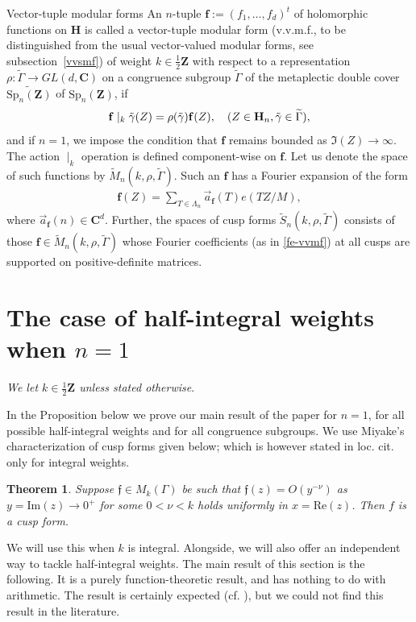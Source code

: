 \documentclass[12pt]{amsart}
\makeatletter
\numberwithin{equation}{section}
\renewcommand\subsubsection{\@secnumfont}{\bfseries}%
\renewcommand\subsubsection{\@startsection{subsubsection}{3}
  \z@{.5\linespacing\@plus.7\linespacing}{-.5em}%
  {\normalfont\bfseries}}
\theoremstyle{plain}
\newtheorem{thm}{Theorem}[section]
\theoremstyle{definition}
\newcommand{\C}{\mf C}
\newcommand{\h}{\mf H}
\newcommand{\re}{\mrm{Re}}
\newcommand{\im}{\mrm{Im}}
\newcommand{\mf}{\mathbf}
\newcommand{\q}{\quad}
\newcommand{\mk}{\mathfrak}
\newcommand{\mrm}{\mathrm}
\newcommand{\spn}{\mrm{Sp}_n(\mf Z)}
\newcommand{\g}{\Tilde{\gamma}}
\newcommand{\mkgam}{M_k(\Gamma)}
\newcommand{\sumn}{\sum \nolimits}
\makeatother
\begin{document}
\subsubsection{Vector-tuple modular forms} \label{vvmf-sec}
An $n$-tuple $\mf f:= (f_1,\ldots,f_d)^t$ of holomorphic functions on $\mf H$ is called a vector-tuple modular form (v.v.m.f., to be distinguished from the usual vector-valued modular forms, see subsection~\ref{vvsmf}) of weight $k \in \tfrac{1}{2}\mf Z$ with respect to a representation $\rho \colon \widetilde{\Gamma} \to GL(d,\mf C)$ on a congruence subgroup $\widetilde{\Gamma}$ of the metaplectic double cover $\widetilde{\spn}$ of $\spn$, if
\[ \mf f \mid_k \g(Z)= \rho(\g) \mf f(Z), \q (Z \in \h_n, \g \in \widetilde{\Gamma}), \]
and if $n=1$, we impose the condition that $\mf f$ remains bounded as $\Im(Z) \to \infty$. The action $\mid_k$ operation is defined component-wise on $\mf f$. Let us denote the space of such functions by $\widetilde{M}_n(k,\rho, \widetilde{\Gamma})$. Such an $\mf f$ has a Fourier expansion of the form
\begin{align} \label{fe-vvmf}
    \mf f (Z) = \sumn_{T \in \Lambda_n} \overset{\rightarrow}{a}_{\mf f}(T) e(TZ/M),
\end{align}
where $\overset{\rightarrow}{a}_{\mf f}(n) \in \C^d$.
Further, the spaces of cusp forms $\widetilde{S}_n(k,\rho, \widetilde{\Gamma})$ consists of those $\mf f \in \widetilde{M}_n(k,\rho, \widetilde{\Gamma})$ whose Fourier coefficients (as in \eqref{fe-vvmf}) at all cusps are supported on positive-definite matrices.


\section{The case of half-integral weights when \texorpdfstring{$n=1$}{} } \label{appn}

\textsl{We let $k \in \tfrac{1}{2} \mf Z$ unless stated otherwise}. 

In the Proposition below we prove our main result of the paper for $n=1$, for all possible half-integral weights and for all congruence subgroups. We use Miyake's characterization \cite[Theorem 2.1.4]{miyake}  of cusp forms given below; which is however stated in loc. cit. only for integral weights.

\begin{thm} \label{miyake}
    Suppose $\mk f \in \mkgam$ be such that $\mk f (z) = O(y^{-\nu})$ as $y=\im(z) \to 0^+$ for some $0<\nu<k$ holds uniformly in $x=\re(z)$. Then $f$ is a cusp form.
\end{thm}
We will use this when $k$ is integral. Alongside, we will also offer an independent way to tackle half-integral weights. The main result of this section is the following. It is a purely function-theoretic result, and has nothing to do with arithmetic. The result is certainly expected (cf. \cite[\S 5,(i)]{bo-ko}), but we could not find this result in the literature.
\end{document}
